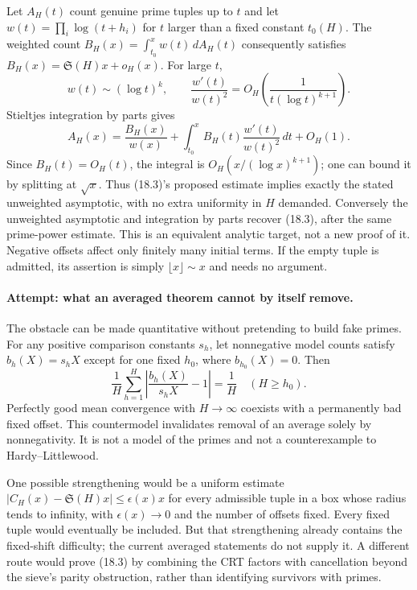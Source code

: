 \documentclass[11pt,a4paper]{article}
\begin{document}
Let $A_H(t)$ count genuine prime tuples up to $t$ and let
$w(t)=\prod_i\log(t+h_i)$ for $t$ larger than a fixed constant $t_0(H)$.
The weighted count $B_H(x)=\int_{t_0}^xw(t)\,dA_H(t)$ consequently satisfies
$B_H(x)=\mathfrak S(H)x+o_H(x)$. For large $t$,
\[
 w(t)\sim(\log t)^k,\qquad
 \frac{w'(t)}{w(t)^2}=O_H\!\left(\frac1{t(\log t)^{k+1}}\right).
\]
Stieltjes integration by parts gives
\[
 A_H(x)=\frac{B_H(x)}{w(x)}
       +\int_{t_0}^x B_H(t)\frac{w'(t)}{w(t)^2}\,dt+O_H(1).
 \tag{18.4}
\]
Since $B_H(t)=O_H(t)$, the integral is
$O_H(x/(\log x)^{k+1})$; one can bound it by splitting at $\sqrt{x}$.
Thus (18.3)'s proposed estimate implies exactly the stated unweighted
asymptotic, with no extra uniformity in $H$ demanded. Conversely the
unweighted asymptotic and integration by parts recover (18.3), after the
same prime-power estimate. This is an equivalent analytic target, not a
new proof of it. Negative offsets affect only finitely many initial terms.
If the empty tuple is admitted, its assertion is simply $\lfloor x\rfloor
\sim x$ and needs no argument.

\paragraph{Attempt: what an averaged theorem cannot by itself remove.}
The obstacle can be made quantitative without pretending to build fake
primes. For any positive comparison constants $s_h$, let nonnegative
model counts satisfy $b_h(X)=s_hX$ except for one fixed $h_0$, where
$b_{h_0}(X)=0$. Then
\[
 \frac1H\sum_{h=1}^H
 \left|\frac{b_h(X)}{s_hX}-1\right|=\frac1H
 \quad(H\geq h_0).
 \tag{18.5}
\]
Perfectly good mean convergence with $H\to\infty$ coexists with a
permanently bad fixed offset. This countermodel invalidates removal of an
average solely by nonnegativity. It is not a model of the primes and
not a counterexample to Hardy--Littlewood.

One possible strengthening would be a uniform estimate
$|C_H(x)-\mathfrak S(H)x|\leq \epsilon(x)x$ for every admissible tuple in
a box whose radius tends to infinity, with $\epsilon(x)\to0$ and the
number of offsets fixed. Every fixed tuple would eventually be included.
But that strengthening already contains the fixed-shift difficulty; the
current averaged statements do not supply it. A different route would
prove (18.3) by combining the CRT factors with cancellation beyond the
sieve's parity obstruction, rather than identifying survivors with primes.
\end{document}
